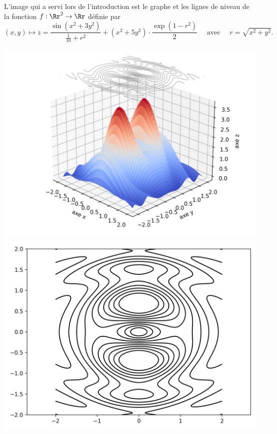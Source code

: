 \documentclass[11pt, class=report,crop=false]{standalone}
\begin{document}
\begin{exemple}
L'image qui a servi lors de l'introduction est le graphe et les lignes de niveau de la fonction $f : \Rr^2 \to \Rr$ définie par
$$(x,y) \mapsto z = 
\frac{\sin \left( x^{2}+3y^{2} \right)}{\frac{1}{10}+r^{2}}+\left( x^{2}+5y^{2} \right)\cdot \frac{\exp \left( 1-r^{2} \right)}{2} \quad \text{ avec } \quad r=\sqrt{x^{2}+y^{2}}.$$

\begin{center}
    \includegraphics[scale=\myscale,scale=0.5]{figures/fonctions-niveau-3c}
    \includegraphics[scale=\myscale,scale=0.5]{figures/fonctions-niveau-3b}
\end{center}



\end{exemple}   
\end{document}

